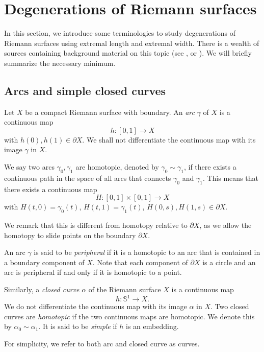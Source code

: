\documentclass[11pt, reqno]{amsart}
\numberwithin{equation}{section}
\theoremstyle{plain}
\theoremstyle{theorem}
\theoremstyle{plain}
\theoremstyle{definition}
\numberwithin{figure}{section}
\begin{document}
\appendix

\section{Degenerations of Riemann surfaces}\label{subsec:dr}
In this section, we introduce some terminologies to study degenerations of Riemann surfaces using extremal length and extremal width.
There is a wealth of sources containing background material on this topic (see \cite{A73}, \cite{Kah06} or \cite[Appendix 4]{KL09}).
We will briefly summarize the necessary minimum.



\subsection{Arcs and simple closed curves}
Let $X$ be a compact Riemann surface with boundary.
An {\em arc} $\gamma$ of $X$ is a continuous map
$$
h: [0,1] \longrightarrow X
$$
with $h(0), h(1) \in \partial X$.
We shall not differentiate the continuous map with its image $\gamma$ in $X$.

We say two arcs $\gamma_0, \gamma_1$ are homotopic, denoted by $\gamma_0 \sim \gamma_1$, if there exists a continuous path in the space of all arcs that connects $\gamma_0$ and $\gamma_1$.
This means that there exists a continuous map 
$$
H:[0,1] \times [0,1] \longrightarrow X
$$
with $H(t,0) = \gamma_0(t)$, $H(t,1) = \gamma_1(t)$, $H(0, s), H(1, s) \in \partial X$.

We remark that this is different from homotopy relative to $\partial X$, as we allow the homotopy to slide points on the boundary $\partial X$.

An arc $\gamma$ is said to be {\em peripheral} if it is a homotopic to an arc that is contained in a boundary component of $X$.
Note that each component of $\partial X$ is a circle and an arc is peripheral if and only if it is homotopic to a point.

Similarly, a {\em closed curve} $\alpha$ of the Riemann surface $X$ is a continuous map
$$
h: \mathbb{S}^1 \longrightarrow X.
$$
We do not differentiate the continuous map with its image $\alpha$ in $X$.
Two closed curves are {\em homotopic} if the two continuous maps are homotopic. 
We denote this by $\alpha_0 \sim \alpha_1$.
It is said to be {\em simple} if $h$ is an embedding.

For simplicity, we refer to both arc and closed curve as curves.
\end{document}
